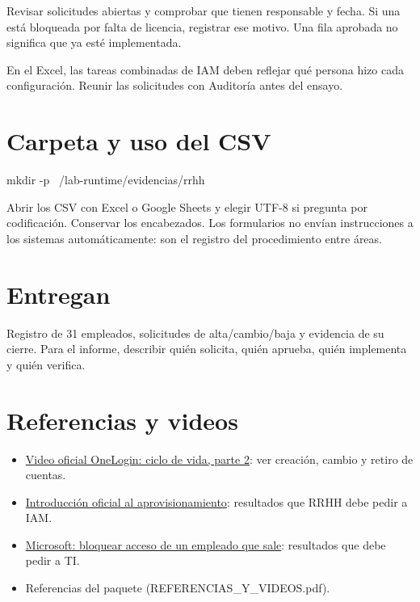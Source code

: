 \documentclass[12pt,a4paper]{article}
\begin{document}
Revisar solicitudes abiertas y comprobar que tienen responsable y fecha. Si una está bloqueada por falta de licencia, registrar ese motivo. Una fila aprobada no significa que ya esté implementada.\par
En el Excel, las tareas combinadas de IAM deben reflejar qué persona hizo cada configuración. Reunir las solicitudes con Auditoría antes del ensayo.\par
{}\section*{Carpeta y uso del CSV}
\begin{Comandos}
mkdir -p ~/lab-runtime/evidencias/rrhh
\end{Comandos}
Abrir los CSV con Excel o Google Sheets y elegir UTF-8 si pregunta por codificación. Conservar los encabezados. Los formularios no envían instrucciones a los sistemas automáticamente: son el registro del procedimiento entre áreas.\par
{}\section*{Entregan}
Registro de 31 empleados, solicitudes de alta/cambio/baja y evidencia de su cierre. Para el informe, describir quién solicita, quién aprueba, quién implementa y quién verifica.\par
{}\section*{Referencias y videos}
\begin{itemize}
\item \href{https://www.onelogin.com/resource-center/videos/getting-started-with-identity-lifecycle-management-pt-2}{Video oficial OneLogin: ciclo de vida, parte 2}: ver creación, cambio y retiro de cuentas.
\item \href{https://onelogin.service-now.com/kb?id=kb_article_view&sysparm_article=KB0010298}{Introducción oficial al aprovisionamiento}: resultados que RRHH debe pedir a IAM.
\item \href{https://learn.microsoft.com/en-us/microsoft-365/admin/add-users/remove-former-employee-step-1?view=o365-worldwide}{Microsoft: bloquear acceso de un empleado que sale}: resultados que debe pedir a TI.
\item Referencias del paquete (REFERENCIAS\_Y\_VIDEOS.pdf).
\end{itemize}
\end{document}
